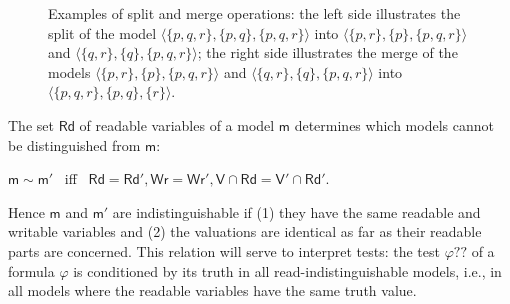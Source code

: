 \documentclass{llncs}
\newcommand{\modl}{\mathsf m}
\newcommand{\readset}{\mathsf{Rd}}
\newcommand{\valuset}{\mathsf{V}}
\newcommand{\writeset}{\mathsf{Wr}}
\newcommand{\testendo}{?\!\!?}			%
\renewcommand{\phi}{\varphi}
\newcommand{\propset}{\mathbb P}
\newcommand{\set}[1]{\{#1\}}
\newcommand{\tuple}[1]{ \langle #1 \rangle}
\begin{document}
\begin{figure}[t]
  \centering
  
\caption{Examples of split and merge operations:
the left side illustrates the split of the model $\tuple{ \set{p,q,r} , \set{p,q} , \set{p,q,r} } $ into 
$\tuple{ \set{p,r} , \set{p} , \set{p,q,r} } $ and 
$\tuple{ \set{q,r} , \set{q} , \set{p,q,r} } $; 
the right side illustrates the merge of the models
$\tuple{ \set{p,r} , \set{p} , \set{p,q,r} } $ and 
$\tuple{ \set{q,r} , \set{q} , \set{p,q,r} } $ into
 $\tuple{ \set{p,q,r} , \set{p,q} , \set{r} } $.
}
\label{fig:splitmerge} 
\end{figure}


The set $\readset$ of readable variables of a model $\modl$ 
determines which models cannot be distinguished from $\modl$:
\begin{center}
$\modl \sim \modl'$ \ iff \ $\readset = \readset' , \writeset = \writeset' , \valuset \cap \readset = \valuset' \cap \readset' $.
\end{center}
Hence $\modl $ and $\modl'$ are indistinguishable if 
(1) they have the same readable and writable variables and  
(2) the valuations are identical as far as their readable parts are concerned.
%
This relation will serve to interpret tests: 
the test $\phi \testendo $ of a formula $\phi$ is conditioned by its truth in all read-indistinguishable models, i.e., 
in all models where the readable variables have the same truth value. 
\end{document}

